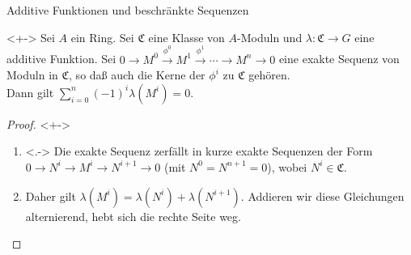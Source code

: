 \begin{frame}{Additive Funktionen und beschränkte Sequenzen}
	\begin{proposition}<+->
		Sei \(A\) ein Ring. Sei \(\mathfrak C\) eine Klasse von \(A\)-Moduln und \(\lambda\colon \mathfrak C
		\to G\) eine additive Funktion. Sei
		\(0 \to M^0 \xrightarrow{\phi^0} M^1 \xrightarrow{\phi^1} \dotsb \to M^n \to 0\) eine exakte Sequenz von Moduln in 
		\(\mathfrak C\),
		so daß auch die Kerne der \(\phi^i\) zu \(\mathfrak C\) gehören.
		\\
		Dann gilt \(\sum\limits_{i = 0}^n (-1)^i \lambda(M^i) = 0\).
	\end{proposition}
	\begin{proof}<+->
		\begin{enumerate}[<+->]
		\item<.->
			Die exakte Sequenz zerfällt in kurze exakte Sequenzen der Form
			\(0 \to N^i \to M^i \to N^{i + 1} \to 0\) (mit \(N^0 = N^{n + 1} = 0\)),
			wobei \(N^i \in \mathfrak C\).
		\item
			Daher gilt \(\lambda(M^i) = \lambda(N^i) + \lambda(N^{i + 1})\). Addieren wir diese Gleichungen
			alternierend, hebt sich die rechte Seite weg.
			\qedhere
		\end{enumerate}
	\end{proof}
\end{frame}

